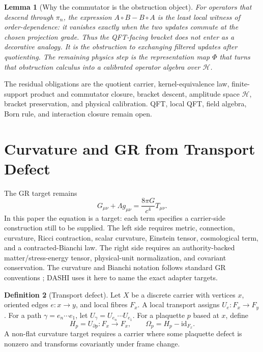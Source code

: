 \documentclass[11pt]{article}
\theoremstyle{definition}
\newtheorem{definition}{Definition}[section]
\theoremstyle{plain}
\newtheorem{lemma}[definition]{Lemma}
\theoremstyle{remark}
\begin{document}
\begin{lemma}[Why the commutator is the obstruction object]
For operators that descend through \(\pi_n\), the expression
\(A\circ B-B\circ A\) is the least local witness of order-dependence: it
vanishes exactly when the two updates commute at the chosen projection grade.
Thus the QFT-facing bracket does not enter as a decorative analogy. It is the
obstruction to exchanging filtered updates after quotienting. The remaining
physics step is the representation map \(\Phi\) that turns that obstruction
calculus into a calibrated operator algebra over \(\mathcal H\).
\end{lemma}

The residual obligations are the quotient carrier, kernel-equivalence law,
finite-support product and commutator closure, bracket descent, amplitude
space \(\mathcal H\), bracket preservation, and physical calibration. QFT,
local QFT, field algebra, Born rule, and interaction closure remain open.

\section{Curvature and GR from Transport Defect}

The GR target remains
\[
G_{\mu\nu}+\Lambda g_{\mu\nu}
=
\frac{8\pi G}{c^4}T_{\mu\nu}.
\]
In this paper the equation is a target: each term specifies a carrier-side
construction still to be supplied. The left side requires
metric, connection, curvature, Ricci contraction, scalar curvature, Einstein
tensor, cosmological term, and a contracted-Bianchi law. The right side
requires an authority-backed matter/stress-energy tensor, physical-unit
normalization, and covariant conservation.
The curvature and Bianchi notation follows standard GR conventions
\cite{wald-1984,carroll-2019,misner-thorne-wheeler-1973}; DASHI uses it here
to name the exact adapter targets.

\begin{definition}[Transport defect]
Let \(X\) be a discrete carrier with vertices \(x\), oriented edges \(e:x\to
y\), and local fibres \(F_x\). A local transport assigns \(U_e:F_x\to F_y\).
For a path \(\gamma=e_n\cdots e_1\), let
\(U_\gamma=U_{e_n}\cdots U_{e_1}\). For a plaquette \(p\) based at \(x\),
define
\[
H_p=U_{\partial p}:F_x\to F_x,
\qquad
\Omega_p=H_p-\mathrm{id}_{F_x}.
\]
A non-flat curvature target requires a carrier where some plaquette defect is
nonzero and transforms covariantly under frame change.
\end{definition}
\end{document}
